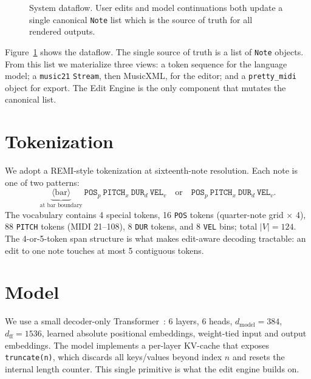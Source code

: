 \documentclass[11pt,a4paper]{article}
\begin{document}
\begin{figure}[t]
\centering
{}
\caption{System dataflow. User edits and model continuations both update
a single canonical \texttt{Note} list which is the source of truth for
all rendered outputs.}
\label{fig:dataflow}
\end{figure}

Figure~\ref{fig:dataflow} shows the dataflow. The single source of truth
is a list of \texttt{Note} objects. From this list we materialize three
views: a token sequence for the language model; a \texttt{music21}
\texttt{Stream}, then MusicXML, for the editor; and a
\texttt{pretty\_midi} object for export. The Edit Engine is the only
component that mutates the canonical list.

\section{Tokenization}\label{sec:tokenizer}

We adopt a REMI-style \cite{huang2020pop} tokenization at sixteenth-note
resolution. Each note is one of two patterns:
\[
  \underbrace{\langle\text{bar}\rangle}_{\text{at bar boundary}}~
  \texttt{POS}_p~\texttt{PITCH}_x~\texttt{DUR}_d~\texttt{VEL}_v
  \quad\text{or}\quad
  \texttt{POS}_p~\texttt{PITCH}_x~\texttt{DUR}_d~\texttt{VEL}_v.
\]
The vocabulary contains 4 special tokens, 16 \texttt{POS} tokens
(quarter-note grid $\times$ 4), 88 \texttt{PITCH} tokens (MIDI
21--108), 8 \texttt{DUR} tokens, and 8 \texttt{VEL} bins; total
$|V|=124$. The 4-or-5-token span structure is what makes edit-aware
decoding tractable: an edit to one note touches at most 5 contiguous
tokens.

\section{Model}

We use a small decoder-only Transformer~\cite{vaswani2017attention}:
6 layers, 6 heads, $d_{\text{model}}=384$, $d_{\text{ff}}=1536$, learned
absolute positional embeddings, weight-tied input and output embeddings.
The model implements a per-layer KV-cache that exposes
\texttt{truncate(n)}, which discards all keys/values beyond index $n$ and
resets the internal length counter. This single primitive is what the
edit engine builds on.
\end{document}
